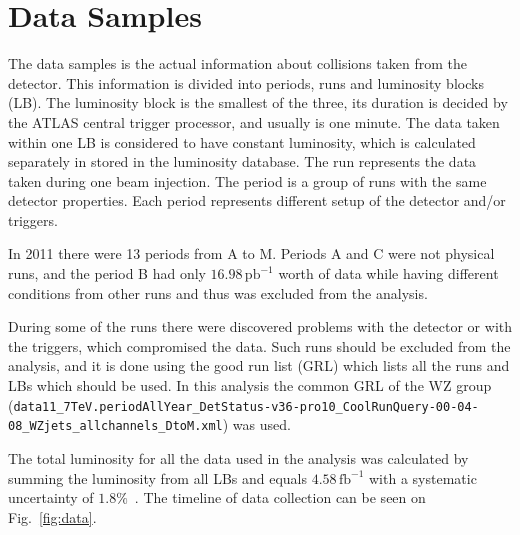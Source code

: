 \chapter{Data Samples}
\label{sec:DataSamples}

The data samples is the actual information about collisions taken from the detector. This information is divided into periods, runs and luminosity blocks (LB). The luminosity block is the smallest of the three, its duration is decided by the ATLAS central trigger processor, and usually is one minute. The data taken within one LB is considered to have constant luminosity, which is calculated separately in stored in the luminosity database. The run represents the data taken during one beam injection. The period is a group of runs with the same detector properties. Each period represents different setup of the detector and/or triggers.

In 2011 there were 13 periods from A to M. Periods A and C were not physical runs, and the period B had only \ensuremath{16.98\,\mathrm{pb}^{-1}} worth of data while having different conditions from other runs and thus was excluded from the analysis.

During some of the runs there were discovered problems with the detector or with the triggers, which compromised the data. Such runs should be excluded from the analysis, and it is done using the good run list (GRL) which lists all the runs and LBs which should be used. In this analysis the common GRL of the WZ group\\
(\texttt{\footnotesize data11\_7TeV.periodAllYear\_DetStatus-v36-pro10\_CoolRunQuery-00-04-08\_WZjets\_allchannels\_DtoM.xml}) was used.

The total luminosity for all the data used in the analysis was calculated by summing the luminosity from all LBs and equals \ensuremath{4.58\,\mathrm{fb}^{-1}} with a systematic uncertainty of $1.8\%$~\cite{lib:lumi}. The timeline of data collection can be seen on Fig.~\ref{fig:data}.

